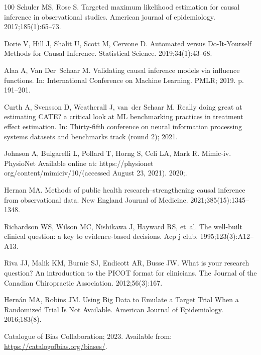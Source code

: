 \documentclass[10pt,letterpaper]{article}
\begin{document}
\begin{thebibliography}{100}
  Schuler MS, Rose S.
  \newblock Targeted maximum likelihood estimation for causal inference in observational studies.
  \newblock American journal of epidemiology. 2017;185(1):65--73.

  Dorie V, Hill J, Shalit U, Scott M, Cervone D.
  \newblock Automated versus Do-It-Yourself Methods for Causal Inference.
  \newblock Statistical Science. 2019;34(1):43--68.

  Alaa A, Van Der~Schaar M.
  \newblock Validating causal inference models via influence functions.
  \newblock In: International Conference on Machine Learning. PMLR; 2019. p. 191--201.

  Curth A, Svensson D, Weatherall J, van~der Schaar M.
  \newblock Really doing great at estimating CATE? a critical look at ML benchmarking practices in treatment effect estimation.
  \newblock In: Thirty-fifth conference on neural information processing systems datasets and benchmarks track (round 2); 2021.

  Johnson A, Bulgarelli L, Pollard T, Horng S, Celi LA, Mark R.
  \newblock Mimic-iv.
  \newblock PhysioNet Available online at: https://physionet org/content/mimiciv/10/(accessed August 23, 2021). 2020;.

  Hernan MA.
  \newblock Methods of public health research--strengthening causal inference from observational data.
  \newblock New England Journal of Medicine. 2021;385(15):1345--1348.

  Richardson WS, Wilson MC, Nishikawa J, Hayward RS, et~al.
  \newblock The well-built clinical question: a key to evidence-based decisions.
  \newblock Acp j club. 1995;123(3):A12--A13.

  Riva JJ, Malik KM, Burnie SJ, Endicott AR, Busse JW.
  \newblock What is your research question? An introduction to the PICOT format for clinicians.
  \newblock The Journal of the Canadian Chiropractic Association. 2012;56(3):167.

  Hernán MA, Robins JM.
  \newblock Using {Big} {Data} to {Emulate} a {Target} {Trial} {When} a {Randomized} {Trial} {Is} {Not} {Available}.
  \newblock American Journal of Epidemiology. 2016;183(8).

  Catalogue of Bias Collaboration; 2023.
  \newblock Available from: \url{https://catalogofbias.org/biases/}.


\end{thebibliography}
\end{document}
